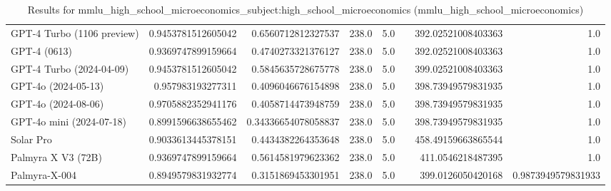 \begin{table}[htp]
{\begin{tabular}{lrrrrrrr}
GPT-4 Turbo (1106 preview) & 0.9453781512605042 & 0.6560712812327537 & 238.0 & 5.0 &  & 392.02521008403363 & 1.0 \\
GPT-4 (0613) & 0.9369747899159664 & 0.4740273321376127 & 238.0 & 5.0 &  & 392.02521008403363 & 1.0 \\
GPT-4 Turbo (2024-04-09) & 0.9453781512605042 & 0.5845635728675778 & 238.0 & 5.0 &  & 399.02521008403363 & 1.0 \\
GPT-4o (2024-05-13) & 0.957983193277311 & 0.4096046676154898 & 238.0 & 5.0 &  & 398.73949579831935 & 1.0 \\
GPT-4o (2024-08-06) & 0.9705882352941176 & 0.4058714473948759 & 238.0 & 5.0 &  & 398.73949579831935 & 1.0 \\
GPT-4o mini (2024-07-18) & 0.8991596638655462 & 0.34336654078058837 & 238.0 & 5.0 &  & 398.73949579831935 & 1.0 \\
Solar Pro & 0.9033613445378151 & 0.4434382264353648 & 238.0 & 5.0 &  & 458.49159663865544 & 1.0 \\
Palmyra X V3 (72B) & 0.9369747899159664 & 0.5614581979623362 & 238.0 & 5.0 &  & 411.0546218487395 & 1.0 \\
Palmyra-X-004 & 0.8949579831932774 & 0.3151869453301951 & 238.0 & 5.0 &  & 399.0126050420168 & 0.9873949579831933 \\
\bottomrule
\end{tabular}}
\caption{Results for mmlu_high_school_microeconomics_subject:high_school_microeconomics (mmlu_high_school_microeconomics)}
\label{fig:mmlu_high_school_microeconomics_subject:high_school_microeconomics (mmlu_high_school_microeconomics)}
\end{table}